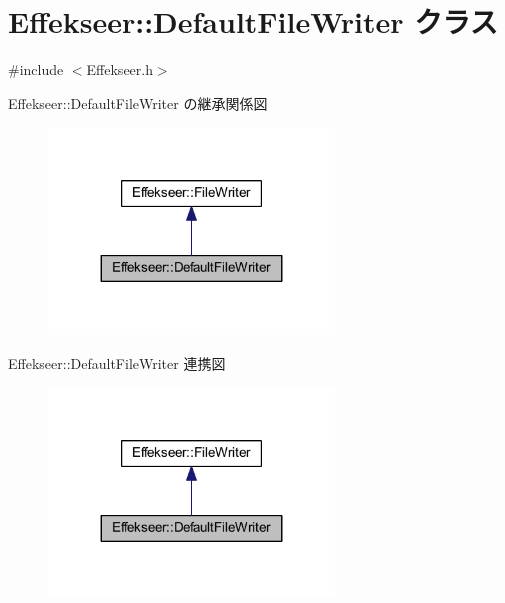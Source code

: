 \hypertarget{class_effekseer_1_1_default_file_writer}{}\section{Effekseer\+:\+:Default\+File\+Writer クラス}
\label{class_effekseer_1_1_default_file_writer}


{\ttfamily \#include $<$Effekseer.\+h$>$}



Effekseer\+:\+:Default\+File\+Writer の継承関係図\nopagebreak
\begin{figure}[H]
\begin{center}
\leavevmode
\includegraphics[width=215pt]{class_effekseer_1_1_default_file_writer__inherit__graph}
\end{center}
\end{figure}


Effekseer\+:\+:Default\+File\+Writer 連携図\nopagebreak
\begin{figure}[H]
\begin{center}
\leavevmode
\includegraphics[width=215pt]{class_effekseer_1_1_default_file_writer__coll__graph}
\end{center}
\end{figure}
